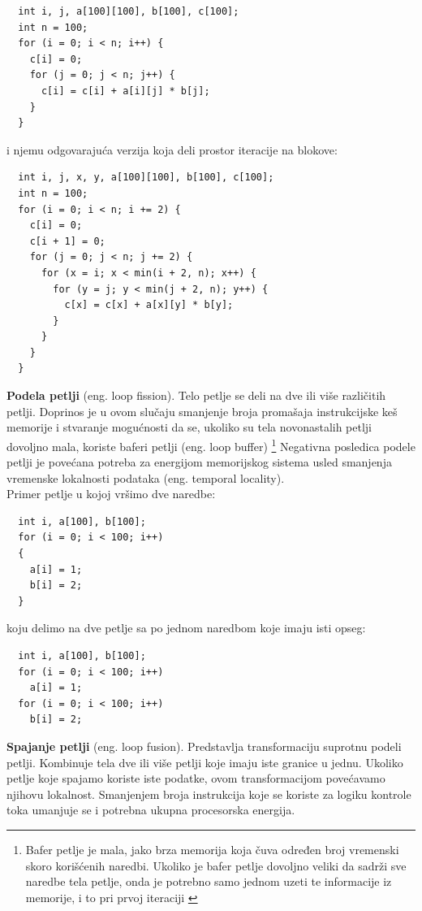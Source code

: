 \documentclass[a4paper]{article}
\begin{document}
\begin{lstlisting}
  int i, j, a[100][100], b[100], c[100];
  int n = 100;
  for (i = 0; i < n; i++) {
    c[i] = 0;
    for (j = 0; j < n; j++) {
      c[i] = c[i] + a[i][j] * b[j];
    }
  }
\end{lstlisting}
i njemu odgovarajuća verzija koja deli prostor iteracije na blokove:
\begin{lstlisting}
  int i, j, x, y, a[100][100], b[100], c[100];
  int n = 100;
  for (i = 0; i < n; i += 2) {
    c[i] = 0;
    c[i + 1] = 0;
    for (j = 0; j < n; j += 2) {
      for (x = i; x < min(i + 2, n); x++) {
        for (y = j; y < min(j + 2, n); y++) {
          c[x] = c[x] + a[x][y] * b[y];
        }
      }
    }
  }
\end{lstlisting}

\textbf{Podela petlji} (eng. loop fission). Telo petlje se deli na dve ili više različitih petlji. Doprinos je u ovom slučaju smanjenje broja promašaja instrukcijske keš memorije i stvaranje mogućnosti da se, ukoliko su tela novonastalih petlji dovoljno mala, koriste baferi petlji (eng. loop buffer) \footnote{Bafer petlje je mala, jako brza memorija koja čuva određen broj vremenski skoro korišćenih naredbi. Ukoliko je bafer petlje dovoljno veliki da sadrži sve naredbe tela petlje, onda je potrebno samo jednom uzeti te informacije iz memorije, i to pri prvoj iteraciji \cite{stallings2000computer}} Negativna posledica podele petlji je povećana potreba za energijom memorijskog sistema usled smanjenja vremenske lokalnosti podataka (eng. temporal locality).\\
Primer petlje u kojoj vršimo dve naredbe:
\begin{lstlisting}
  int i, a[100], b[100];
  for (i = 0; i < 100; i++)
  {
    a[i] = 1; 
    b[i] = 2;
  }
\end{lstlisting}
koju delimo na dve petlje sa po jednom naredbom koje imaju isti opseg:
\begin{lstlisting}
  int i, a[100], b[100];
  for (i = 0; i < 100; i++)
    a[i] = 1;                     
  for (i = 0; i < 100; i++)
    b[i] = 2;
\end{lstlisting}

\textbf{Spajanje petlji} (eng. loop fusion). Predstavlja transformaciju suprotnu podeli petlji. Kombinuje tela dve ili više petlji koje imaju iste
granice u jednu. Ukoliko petlje koje spajamo koriste iste podatke, ovom transformacijom povećavamo
njihovu lokalnost. Smanjenjem broja instrukcija koje se koriste za logiku kontrole toka umanjuje se 
i potrebna ukupna procesorska energija.\\
\end{document}
